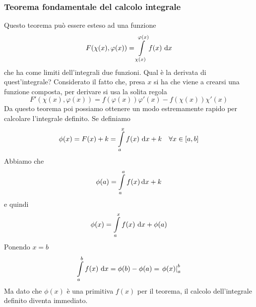 \subsubsection{Teorema fondamentale del calcolo integrale}
Questo teorema può essere esteso ad una funzione
\begin{equation*}
  F(\chi(x),\varphi(x)) = \int\limits_{\chi(x)}^{\varphi(x)} f(x)\,\mathop{}\!\mathrm{d} x
\end{equation*}
che ha come limiti dell'integrali due funzioni. Qual è la derivata di quest'integrale? Considerato
il fatto che, presa $x$ si ha che viene a crearsi una funzione composta, per derivare si usa la
solita regola
\begin{equation*}
  F'(\chi(x),\varphi(x)) = f(\varphi(x))\varphi'(x) - f(\chi(x))\chi'(x)
\end{equation*}
Da questo teorema poi possiamo ottenere un modo estremamente rapido per calcolare l'integrale 
definito. Se definiamo
\begin{equation*}
  \phi(x) = F(x)+k = \int\limits_{a}^{x} f(x)\,\mathop{}\!\mathrm{d} x+k\quad\forall x\in[a,b]
\end{equation*}
Abbiamo che
\begin{equation*}
  \phi(a) = \int\limits_{a}^{a} f(x)\mathop{}\!\mathrm{d} x+k
\end{equation*}
e quindi
\begin{equation*}
  \phi(x)=\int\limits_{a}^{x} f(x)\,\mathop{}\!\mathrm{d} x+\phi(a)
\end{equation*}
Ponendo $x=b$
\begin{equation*}
  \int\limits_{a}^{b} f(x)\,\mathop{}\!\mathrm{d} x = \phi(b)-\phi(a) = \left.\phi(x)\right|_a^b
\end{equation*}
Ma dato che $\phi(x)$ è una primitiva $f(x)$ per il teorema, il calcolo dell'integrale
definito diventa immediato.
